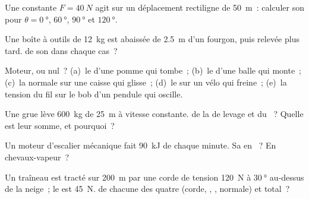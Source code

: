 \begin{exercise}[$\star$]\label{exo:g11:work-of-force:1}
Une  constante $F = \qty{40}{N}$ agit
sur un déplacement rectiligne de \qty{50}{m}~: calculer son
 pour $\theta = \qty{0}{\degree}$,
$\qty{60}{\degree}$, $\qty{90}{\degree}$ et $\qty{120}{\degree}$.
\end{exercise}

\begin{exercise}[$\star$]\label{exo:g11:work-of-force:2}
Une boîte à outils de \qty{12}{kg} est abaissée de \qty{2.5}{m} d'un
fourgon, puis relevée plus tard.  de son
 dans chaque cas~?
\end{exercise}

\begin{exercise}[$\star$]\label{exo:g11:work-of-force:3}
Moteur,
 ou nul~? (a)~le
 d'une pomme qui tombe~;
(b)~le  d'une balle qui
monte~; (c)~la  normale sur une caisse
qui glisse~; (d)~le  sur un
vélo qui freine~; (e)~la tension du fil
sur le bob d'un pendule qui oscille.
\end{exercise}

\begin{exercise}[$\star$]\label{exo:g11:work-of-force:4}
Une grue lève \qty{600}{kg} de \qty{25}{m} à vitesse constante.
 de la
 de levage et du
~? Quelle est leur somme, et
pourquoi~?
\end{exercise}

\begin{exercise}[$\star$]\label{exo:g11:work-of-force:5}
Un moteur d'escalier mécanique fait
\qty{90}{kJ} de  chaque minute. Sa
 en
~? En
chevaux-vapeur~?
\end{exercise}

\begin{exercise}[$\star\star$]\label{exo:g11:work-of-force:6}
Un traîneau est tracté sur \qty{200}{m} par une corde de
tension \qty{120}{N} à
$\qty{30}{\degree}$ au-dessus de la neige~; le
 est \qty{45}{N}.
 de chacune des quatre
 (corde,
,
, normale) et total~?
\end{exercise}

